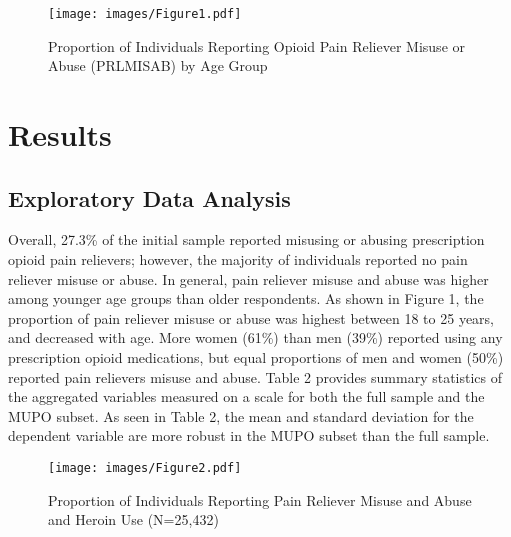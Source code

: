 \documentclass[sigconf]{acmart}
\begin{document}
\begin{figure}[!ht]
  \centering\texttt{[image: images/Figure1.pdf]}
  \caption{Proportion of Individuals Reporting Opioid Pain Reliever Misuse 
  or Abuse (PRLMISAB) by Age Group}
  \label{f:Figure1}
\end{figure}

\section{Results}

\subsection{Exploratory Data Analysis}

Overall, 27.3\% of the initial sample reported misusing or abusing 
prescription opioid pain relievers; however, the majority of individuals 
reported no pain reliever misuse or abuse. In general, pain reliever misuse 
and abuse was higher among younger age groups than older respondents. As shown 
in Figure 1, the proportion of pain reliever misuse or abuse was highest 
between 18 to 25 years, and decreased with age. More women (61\%) than men 
(39\%) reported using any prescription opioid medications, but equal 
proportions of men and women (50\%) reported pain relievers misuse and abuse. 
Table 2 provides summary statistics of the aggregated variables measured on 
a scale for both the full sample and the MUPO subset. As seen in Table 2, 
the mean and standard deviation for the dependent variable are more robust 
in the MUPO subset than the full sample.  

\begin{figure}[!ht]
  \centering\texttt{[image: images/Figure2.pdf]}
  \caption{Proportion of Individuals Reporting Pain Reliever Misuse
  and Abuse and Heroin Use (N=25,432)}
  \label{f:Figure2}
\end{figure}

\end{document}
